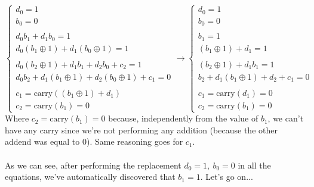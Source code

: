 \begin{equation*}
    \begin{cases}
        
        d_0=1\\
        b_0=0\\\\
        
        d_0b_1+d_1b_0=1\\
        d_0(b_1\oplus1)+d_1(b_0\oplus1)=1\\\\
        
        d_0(b_2\oplus1)+d_1b_1+d_2b_0+c_2=1\\
        d_0b_2+d_1(b_1\oplus1)+d_2(b_0\oplus1)+c_1=0\\\\

        c_1=\text{carry}((b_1\oplus1)+d_1)\\
        c_2=\text{carry}(b_1)=0
        
    \end{cases}\longrightarrow
    \begin{cases}
        
        d_0=1\\
        b_0=0\\\\
        
        b_1=1\\
        (b_1\oplus1)+d_1=1\\\\
        
        (b_2\oplus1)+d_1b_1=1\\
        b_2+d_1(b_1\oplus1)+d_2+c_1=0\\\\

        c_1=\text{carry}(d_1)=0\\
        c_2=\text{carry}(b_1)=0
        
    \end{cases}
\end{equation*}
Where $c_2=\text{carry}(b_1)=0$ because, independently from the value of $b_1$, we can't have any carry since we're not performing any addition (because the other addend was equal to 0). Same reasoning goes for $c_1$.\\\\
As we can see, after performing the replacement $d_0=1,\ b_0=0$ in all the equations, we've automatically discovered that $b_1=1$. Let's go on...

